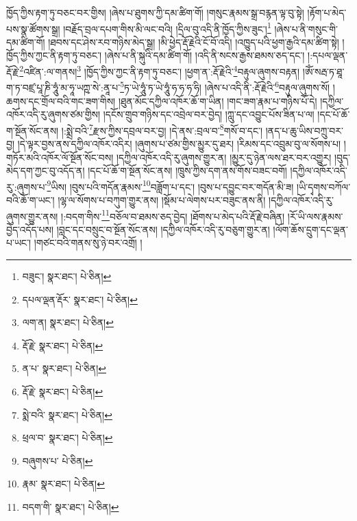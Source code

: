 ཁྱོད་ཀྱིས་རྟག་ཏུ་བཅང་བར་གྱིས། །ཞེས་པ་ཐུགས་ཀྱི་དམ་ཚིག་གོ། །གསུང་རྣམས་སྒྲ་བརྙན་ལྟ་བུ་སྟེ། །རྟོག་པ་མེད་པས་སྣ་ཚོགས་སྒྲ། །བརྗོད་བྲལ་དཔག་གིས་མི་ལང་བའི། །དྲིལ་བུ་འདི་ནི་ཁྱོད་ཀྱིས་ཟུང་།\footnote{བཟུང་།  སྣར་ཐང་།  པེ་ཅིན། } །ཞེས་པ་ནི་གསུང་གི་དམ་ཚིག་གོ། །ཐབས་དང་ཤེས་རབ་གཉིས་མེད་སྒྲ། །མི་ཕྱེད་རྡོ་རྗེའི་ངོ་བོ་འདི། །འཁྱུད་པའི་ཕྱག་རྒྱའི་དམ་ཚིག་སྟེ། །ཁྱོད་ཀྱིས་ཀྱང་ནི་རྟག་ཏུ་བཅང་། །ཞེས་པ་ནི་སྐུའི་དམ་ཚིག་གོ། །འདི་ནི་སངས་རྒྱས་ཐམས་ཅད་དང་། །:དཔལ་ལྡན་རྡོ་རྗེ་\footnote{དཔལ་ལྡན་རྡོར་  སྣར་ཐང་།  པེ་ཅིན། }འཛིན་:ལ་གནས།\footnote{ལག་ན།  སྣར་ཐང་།  པེ་ཅིན། } །ཁྱོད་ཀྱིས་ཀྱང་ནི་རྟག་ཏུ་བཅང་། །ཕྱག་ན་:རྡོ་རྗེའི་\footnote{རྡོ་རྗེ་  སྣར་ཐང་།  པེ་ཅིན། }བརྟུལ་ཞུགས་བརྟན། །ཨོཾ་སརྦ་ཏ་ཐཱ་ག་ཏ་བཛྲ་པཱ་ཎི་ཧཱུཾ་མ་ཧཱ་ཡཀྵ་སེ་:ནཱ་པ་\footnote{ན་པ་  སྣར་ཐང་།  པེ་ཅིན། }ཏ་ཡེ་ཧཱུཾ་ཏ་ཡེ་ཧཱུཾ་ཧ་ཧ་ཧ་ཧི། །ཞེས་པ་འདི་ནི་:རྡོ་རྗེའི་\footnote{རྡོ་རྗེ་  སྣར་ཐང་།  པེ་ཅིན། }བརྟུལ་ཞུགས་སོ། །ཆགས་དང་གྲོལ་བའི་གང་ཟག་གིས། །ཐུན་མོང་དཀྱིལ་འཁོར་ཆོ་ག་ཡིན། །གང་ཟག་རྣམ་པ་གཉིས་པོ་དེ། །དཀྱིལ་འཁོར་འདི་རུ་ཞུགས་ཙམ་གྱིས། །དངོས་གྲུབ་གཉིས་དང་འབྲེལ་བར་བྱེད། །ཀླུ་དང་འབྱུང་པོས་ཟིན་པ་ལ། །དང་པོ་ཆོ་ག་སྔོན་སོང་ནས། །:སྨྲེ་བའི་\footnote{སྨེ་བའི་  སྣར་ཐང་།  པེ་ཅིན། }རྫས་ཀྱིས་དབྲལ་བར་བྱ། །དེ་ནས་:བྲལ་བ་\footnote{ཕྲལ་བ་  སྣར་ཐང་།  པེ་ཅིན། }གསོ་བ་དང་། །ནད་པ་ཆུ་ཡིས་བཀྲུ་བར་བྱ། །དེ་ལྟར་བྱས་ནས་དཀྱིལ་འཁོར་འདིར། །ཞུགས་པ་ཙམ་གྱིས་མྱུར་དུ་ཐར། །རིམས་དང་འབྲུམ་བུ་ལ་སོགས་པ། །གཏོར་མའི་འཁོར་ལོ་སྔོན་སོང་བས། །དཀྱིལ་འཁོར་འདི་རུ་ཞུགས་གྱུར་ན། །མྱུར་དུ་ཉེན་ལས་ཐར་བར་འགྱུར། །བུད་མེད་དག་ཀྱང་བུ་འདོད་ན། །དང་པོ་ཆོ་ག་སྔོན་སོང་ནས། །ཁྲུས་ཀྱིས་དག་ནས་གོས་བཟང་བགོ། །དཀྱིལ་འཁོར་འདི་རུ་:ཞུགས་པ་\footnote{བཞུགས་པ་  པེ་ཅིན། }ཡིས། །བུས་པའི་གདོན་རྣམས་\footnote{རྣམ་  སྣར་ཐང་།  པེ་ཅིན། }བཟློག་པ་དང་། །བུས་པ་དབྱུང་བར་གདོན་མི་ཟ། །ཡི་དྭགས་བཀོལ་བའི་ཆོ་ག་ཡང་། །ལྷ་ལ་སོགས་པ་བཀུག་གྱུར་ནས། །སྡོམ་པ་ལེགས་པར་བཟུང་ནས་ནི། །དཀྱིལ་འཁོར་འདི་རུ་ཞུགས་གྱུར་ནས། །:བདག་གིས་\footnote{བདག་གི་  སྣར་ཐང་།  པེ་ཅིན། }བཅོལ་བ་ཐམས་ཅད་བྱེད། །ཐོགས་པ་མེད་པའི་རྡོ་རྗེ་བཞིན། །རོ་ཡི་ལས་རྣམས་བྱེད་འདོད་པས། །བླང་དང་བསྲུང་བ་སྔོན་སོང་ནས། །དཀྱིལ་འཁོར་འདི་རུ་བཅུག་གྱུར་ན། །ལོག་ཆོས་དྲུག་དང་ལྡན་པ་ཡང་། །གཙང་བའི་གནས་སུ་ཉེ་བར་འགྲོ། །
